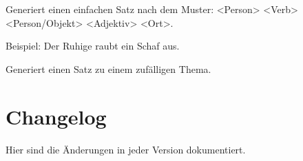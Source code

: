\documentclass[a4paper,12pt,oneside]{sphinxmanual}
\begin{document}
\begin{fulllineitems}
\label{module:pyzufall.satz.satz_standard_4}
Generiert einen einfachen Satz nach dem Muster: \textless{}Person\textgreater{} \textless{}Verb\textgreater{} \textless{}Person/Objekt\textgreater{} \textless{}Adjektiv\textgreater{} \textless{}Ort\textgreater{}.

Beispiel: Der Ruhige raubt ein Schaf aus.

\end{fulllineitems}


\begin{fulllineitems}
\label{module:pyzufall.satz.satz_thema}
Generiert einen Satz zu einem zufälligen Thema.

\end{fulllineitems}



\chapter{Changelog}
\label{changelog::doc}\label{changelog:changelog}
Hier sind die Änderungen in jeder Version dokumentiert.
\end{document}

